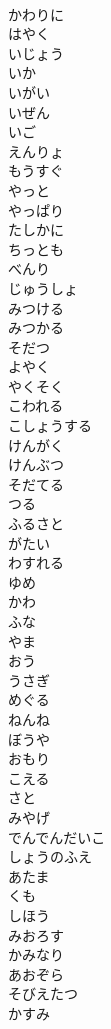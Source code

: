 \documentclass[8pt]{extreport}
\begin{document}
\begin{CJK}{UTF8}{min}
\\	かわりに
\\	はやく
\\	いじょう
\\	いか
\\	いがい
\\	いぜん
\\	いご
\\	えんりょ
\\	もうすぐ
\\	やっと
\\	やっぱり
\\	たしかに
\\	ちっとも
\\	べんり
\\	じゅうしょ
\\	みつける
\\	みつかる
\\	そだつ
\\	よやく
\\	やくそく
\\	こわれる
\\	こしょうする
\\	けんがく
\\	けんぶつ
\\	そだてる
\\	つる
\\	ふるさと
\\	がたい
\\	わすれる
\\	ゆめ
\\	かわ
\\	ふな
\\	やま
\\	おう
\\	うさぎ
\\	めぐる
\\	ねんね
\\	ぼうや
\\	おもり
\\	こえる
\\	さと
\\	みやげ
\\	でんでんだいこ
\\	しょうのふえ
\\	あたま
\\	くも
\\	しほう
\\	みおろす
\\	かみなり
\\	あおぞら
\\	そびえたつ
\\	かすみ

\end{CJK}
\end{document}
